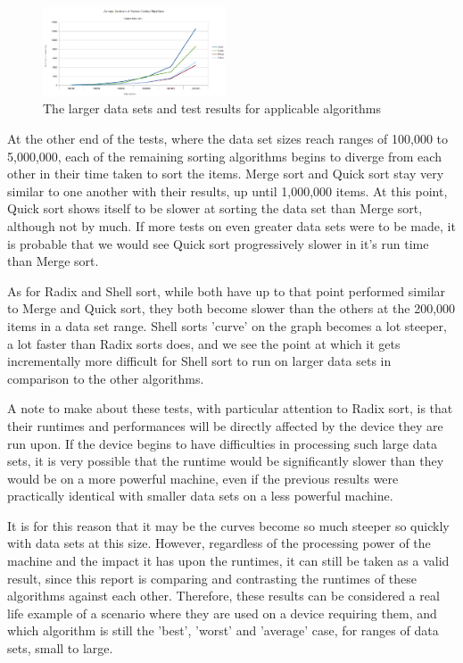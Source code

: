\documentclass{acm_proc_article-sp}
\begin{document}
\begin{figure}[h!]
\centering
\includegraphics[width=0.48\textwidth]{img/graph_larger.png}
\caption{The larger data sets and test results for applicable algorithms}
\end{figure}

At the other end of the tests, where the data set sizes reach ranges of 100,000 to 5,000,000,
each of the remaining sorting algorithms begins to diverge from each other in their time taken
to sort the items. Merge sort and Quick sort stay very similar to one another with their results,
up until 1,000,000 items. At this point, Quick sort shows itself to be slower at
sorting the data set than Merge sort, although not by much. If more tests on
even greater data sets were to be made, it is probable that we would see Quick sort
progressively slower in it's run time than Merge sort.

As for Radix and Shell sort, while both have up to that point performed similar to
Merge and Quick sort, they both become slower than the others at the 200,000
items in a data set range. Shell sorts 'curve' on the graph becomes a lot steeper,
 a lot faster than Radix sorts does, and we see the point at which it gets incrementally
more difficult for Shell sort to run on larger data sets in comparison to the other algorithms.

A note to make about these tests, with particular attention to Radix sort, is that 
their runtimes and performances will be directly affected by the device they are
run upon. If the device begins to have difficulties in processing such large data
sets, it is very possible that the runtime would be significantly slower than
they would be on a more powerful machine, even if the previous results
were practically identical with smaller data sets on a less powerful machine.

It is for this reason that it may be the curves become so much
steeper so quickly with data sets at this size. However, regardless of the
processing power of the machine and the impact it has upon the runtimes, it
can still be taken as a valid result, since this report is comparing and contrasting
the runtimes of these algorithms against each other. Therefore, these
results can be considered a real life example of a scenario where they are
used on a device requiring them, and which algorithm is still the 'best',
 'worst' and 'average' case, for ranges of data sets, small to large.
\end{document}

